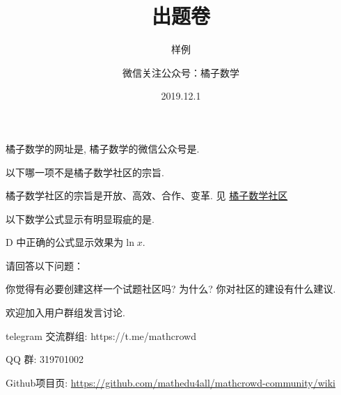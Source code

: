 \documentclass[answers,custom]{BHCexam}
\begin{document}
\title{出题卷}

\subtitle{样例}


\author{微信关注公众号：橘子数学}

\date{2019.12.1}

\maketitle

\begin{groups}

\begin{questions}[s]

\question[30] 橘子数学的网址是, 橘子数学的微信公众号是.

\end{questions}

\begin{questions}[ps]

\question[30] 以下哪一项不是橘子数学社区的宗旨.

\begin{solution}{4cm}
\method 橘子数学社区的宗旨是开放、高效、合作、变革.
\method 见 \href{http://docs.mathcrowd.cn/zh_CN/latest/community/principles.html}{橘子数学社区}
\end{solution}

\question[40] 以下数学公式显示有明显瑕疵的是.

\begin{solution}{4cm}
\methodonly D 中正确的公式显示效果为$\ln{x}$.
\end{solution}
\end{questions}

\begin{questions}[st]
\question[30] 请回答以下问题：
\begin{subquestions}
    \subquestion 你觉得有必要创建这样一个试题社区吗? 为什么?
    \subquestion 你对社区的建设有什么建议.
\end{subquestions}

\begin{solution}{8cm}
    \methodonly 欢迎加入用户群组发言讨论.

telegram 交流群组: https://t.me/mathcrowd

QQ 群: 319701002

Github项目页: \url{https://github.com/mathedu4all/mathcrowd-community/wiki}


\end{solution}
\end{questions}

\end{groups}
\end{document}

